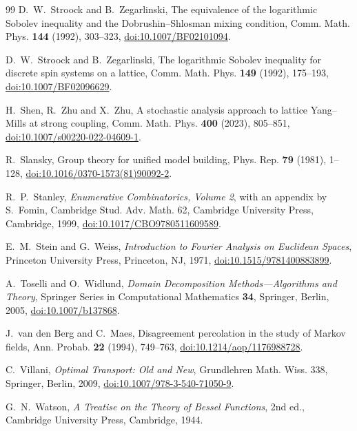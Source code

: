 \documentclass[aps,prd,twocolumn,superscriptaddress,nofootinbib,longbibliography,floatfix,amsmath,amssymb,10pt]{revtex4-2}
\theoremstyle{definition}
\theoremstyle{remark}
\begin{document}
\begin{thebibliography}{99}
D.~W.~Stroock and B.~Zegarlinski, The equivalence of the logarithmic Sobolev
inequality and the Dobrushin--Shlosman mixing condition, Comm. Math. Phys.
\textbf{144} (1992), 303--323,
\href{https://doi.org/10.1007/BF02101094}{doi:10.1007/BF02101094}.

D.~W.~Stroock and B.~Zegarlinski, The logarithmic Sobolev inequality for
discrete spin systems on a lattice, Comm. Math. Phys. \textbf{149} (1992),
175--193,
\href{https://doi.org/10.1007/BF02096629}{doi:10.1007/BF02096629}.

H.~Shen, R.~Zhu and X.~Zhu, A stochastic analysis approach to lattice
Yang--Mills at strong coupling, Comm. Math. Phys. \textbf{400} (2023),
805--851, \href{https://doi.org/10.1007/s00220-022-04609-1}{doi:10.1007/s00220-022-04609-1}.

R.~Slansky, Group theory for unified model building, Phys. Rep.
\textbf{79} (1981), 1--128,
\href{https://doi.org/10.1016/0370-1573(81)90092-2}{doi:10.1016/0370-1573(81)90092-2}.

R.~P.~Stanley, \emph{Enumerative Combinatorics, Volume 2}, with an appendix by
S.~Fomin, Cambridge Stud.
Adv. Math. 62, Cambridge University Press, Cambridge, 1999,
\href{https://doi.org/10.1017/CBO9780511609589}{doi:10.1017/CBO9780511609589}.

E.~M.~Stein and G.~Weiss, \emph{Introduction to Fourier Analysis on Euclidean Spaces}, Princeton University Press, Princeton, NJ, 1971, \href{https://doi.org/10.1515/9781400883899}{doi:10.1515/9781400883899}.

A.~Toselli and O.~Widlund, \emph{Domain Decomposition Methods---Algorithms
and Theory}, Springer Series in Computational Mathematics \textbf{34},
Springer, Berlin, 2005,
\href{https://doi.org/10.1007/b137868}{doi:10.1007/b137868}.

J.~van den Berg and C.~Maes, Disagreement percolation in the study of
Markov fields, Ann. Probab. \textbf{22} (1994), 749--763,
\href{https://doi.org/10.1214/aop/1176988728}{doi:10.1214/aop/1176988728}.

C.~Villani, \emph{Optimal Transport: Old and New}, Grundlehren Math. Wiss.
338, Springer, Berlin, 2009,
\href{https://doi.org/10.1007/978-3-540-71050-9}{doi:10.1007/978-3-540-71050-9}.

G.~N.~Watson, \emph{A Treatise on the Theory of Bessel Functions}, 2nd ed., Cambridge University Press, Cambridge, 1944.


\end{thebibliography}
\end{document}
